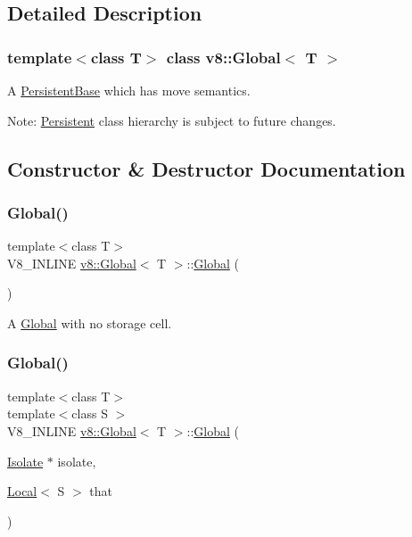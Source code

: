 \subsection{Detailed Description}
\subsubsection*{template$<$class T$>$\newline
class v8\+::\+Global$<$ T $>$}

A \mbox{\hyperlink{classv8_1_1PersistentBase}{Persistent\+Base}} which has move semantics.

Note\+: \mbox{\hyperlink{classv8_1_1Persistent}{Persistent}} class hierarchy is subject to future changes. 

\subsection{Constructor \& Destructor Documentation}
\mbox{\label{classv8_1_1Global_ab1efdf25ff6305e67f3266a6fe90527e}} 
\subsubsection{\texorpdfstring{Global()}{Global()}\hspace{0.1cm}{\footnotesize\ttfamily [1/4]}}
{\footnotesize\ttfamily template$<$class T$>$ \\
V8\+\_\+\+I\+N\+L\+I\+NE \mbox{\hyperlink{classv8_1_1Global}{v8\+::\+Global}}$<$ T $>$\+::\mbox{\hyperlink{classv8_1_1Global}{Global}} (\begin{DoxyParamCaption}{ }\end{DoxyParamCaption})\hspace{0.3cm}{\ttfamily [inline]}}

A \mbox{\hyperlink{classv8_1_1Global}{Global}} with no storage cell. \mbox{\label{classv8_1_1Global_a8434bb6729eb4cd0cd85ad81bd8344ad}} 
\subsubsection{\texorpdfstring{Global()}{Global()}\hspace{0.1cm}{\footnotesize\ttfamily [2/4]}}
{\footnotesize\ttfamily template$<$class T$>$ \\
template$<$class S $>$ \\
V8\+\_\+\+I\+N\+L\+I\+NE \mbox{\hyperlink{classv8_1_1Global}{v8\+::\+Global}}$<$ T $>$\+::\mbox{\hyperlink{classv8_1_1Global}{Global}} (\begin{DoxyParamCaption}\item[{\mbox{\hyperlink{classv8_1_1Isolate}{Isolate}} $\ast$}]{isolate,  }\item[{\mbox{\hyperlink{classv8_1_1Local}{Local}}$<$ S $>$}]{that }\end{DoxyParamCaption})\hspace{0.3cm}{\ttfamily [inline]}}

